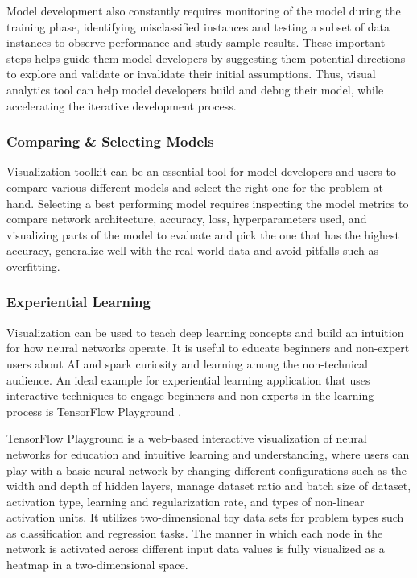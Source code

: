 Model development also constantly requires monitoring of the model during the training phase, identifying misclassified instances and testing a subset of data instances to observe performance and study sample results. These important steps helps guide them model developers by suggesting them potential directions to explore and validate or invalidate their initial assumptions. Thus, visual analytics tool can help model developers build and debug their model, while accelerating the iterative development process.

\subsubsection*{Comparing \& Selecting Models}

Visualization toolkit can be an essential tool for model developers and users to compare various different models and select the right one for the problem at hand. Selecting a best performing model requires inspecting the model metrics to compare network architecture, accuracy, loss, hyperparameters used, and visualizing parts of the model to evaluate and pick the one that has the highest accuracy, generalize well with the real-world data and avoid pitfalls such as overfitting.

\subsubsection*{Experiential Learning}

Visualization can be used to teach deep learning concepts and build an intuition for how neural networks operate. It is useful to educate beginners and non-expert users about AI and spark curiosity and learning among the non-technical audience. An ideal example for experiential learning application that uses interactive techniques to engage beginners and non-experts in the learning process is TensorFlow Playground \cite{edsarx.1708.0378820170101}.

TensorFlow Playground is a web-based interactive visualization of neural networks for education and intuitive learning and understanding, where users can play with a basic neural network by changing different configurations such as the width and depth of hidden layers, manage dataset ratio and batch size of dataset, activation type, learning and regularization rate, and types of non-linear activation units. It utilizes two-dimensional toy data sets for problem types such as classification and regression tasks. The manner in which each node in the network is activated across different input data values is fully visualized as a heatmap in a two-dimensional space.

